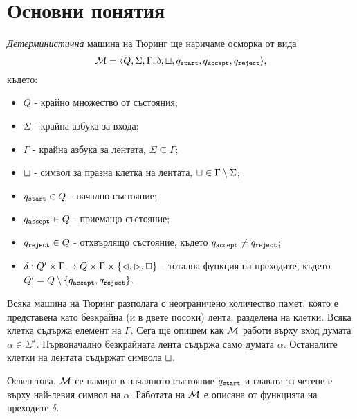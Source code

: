 \section{Основни понятия}
{\em Детерминистична} машина на Тюринг ще наричаме осморка от вида 
\[\mathcal{M} = \langle{Q,\Sigma,\Gamma,\delta,\sqcup,q_{\texttt{start}},q_{\texttt{accept}}, q_{\texttt{reject}}}\rangle,\] където:
\begin{itemize}
\item 
  $Q$ - крайно множество от състояния;
\item
  $\Sigma$ - крайна азбука за входа;
\item
  $\Gamma$ - крайна азбука за лентата, $\Sigma \subseteq \Gamma$;

\item
  $\sqcup$ - символ за празна клетка на лентата,  $\sqcup \in \Gamma \setminus \Sigma$;
\item
  $q_{\texttt{start}} \in Q$ - начално състояние;
\item
  $q_{\texttt{accept}} \in Q$ - приемащо състояние;
\item
  $q_{\texttt{reject}} \in Q$ - отхвърлящо състояние, където $q_{\texttt{accept}} \neq q_{\texttt{reject}}$;
\item
  $\delta:Q'\times\Gamma \to Q\times \Gamma \times \{\lhd,\rhd,\Box\}$ - тотална функция на преходите, където
  $Q' = Q \setminus\{q_{\texttt{accept}}, q_{\texttt{reject}}\}$.
\end{itemize}

Всяка машина на Тюринг разполага с неограничено количество памет, която е представена като безкрайна (и в двете посоки) лента, разделена на клетки.
Всяка клетка съдържа елемент на $\Gamma$.
Сега ще опишем как $\mathcal{M}$ работи върху вход думата $\alpha \in \Sigma^\star$.
Първоначално безкрайната лента съдържа само думата $\alpha$. Останалите клетки на лентата съдържат символа $\sqcup$.

Освен това, $\mathcal{M}$ се намира в началното състояние $q_{\texttt{start}}$ и главата за четене е върху най-левия символ на $\alpha$.
Работата на $\mathcal{M}$ е описана от функцията на преходите $\delta$.
  
